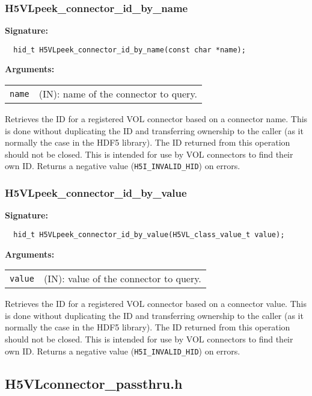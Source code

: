 \subsubsection{H5VLpeek\_connector\_id\_by\_name}
\begin{mdframed}[style=bgbox]
\textbf{Signature:}
\begin{lstlisting}
  hid_t H5VLpeek_connector_id_by_name(const char *name); 
\end{lstlisting}
\textbf{Arguments:}\\
\begin{tabular}{l p{13.5cm}}
 {\tt name} & (IN): name of the connector to query.\\
\end{tabular}
\end{mdframed}
Retrieves the ID for a registered VOL connector based on a connector name.
This is done without duplicating
the ID and transferring ownership to the caller (as it normally the case in the
HDF5 library). The ID returned from this operation should not be closed.
This is intended for use by VOL connectors to find their own ID.
Returns a negative value ({\tt H5I\_INVALID\_HID}) on errors.
\bigskip


\subsubsection{H5VLpeek\_connector\_id\_by\_value}
\begin{mdframed}[style=bgbox]
\textbf{Signature:}
\begin{lstlisting}
  hid_t H5VLpeek_connector_id_by_value(H5VL_class_value_t value); 
\end{lstlisting}
\textbf{Arguments:}\\
\begin{tabular}{l p{13.5cm}}
 {\tt value} & (IN): value of the connector to query.\\
\end{tabular}
\end{mdframed}
Retrieves the ID for a registered VOL connector based on a connector value.
This is done without duplicating
the ID and transferring ownership to the caller (as it normally the case in the
HDF5 library). The ID returned from this operation should not be closed.
This is intended for use by VOL connectors to find their own ID.
Returns a negative value ({\tt H5I\_INVALID\_HID}) on errors.
\bigskip


\subsection{H5VLconnector\_passthru.h}

